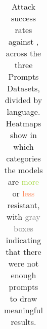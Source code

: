 \begin{table}[ht]
\begin{adjustbox}{width=0.75\textwidth,center=\textwidth}
\begin{tabular}{>{\small}p{1.1cm}c}
\\
\hline
\end{tabular}
\end{adjustbox}
\caption{Attack success rates against \SalamandraInstructedVII{}, across the three \RedTeaming{} Prompts Datasets, divided by language. 
Heatmaps show in which categories the models are 
\textcolor[HTML]{ABDA4E}{more} or \textcolor[HTML]{FC8B5F}{less} resistant, with \textcolor{gray}{gray boxes} indicating that there were not enough prompts to draw meaningful results.}
\label{tab:safety_heatmaps_salamandra_full}
\end{table}



